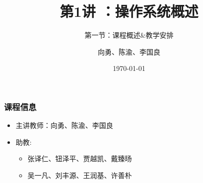 


\title[第1讲]{第1讲 ：操作系统概述} %
\subtitle{第一节：课程概述\&教学安排}
\author{向勇、陈渝、李国良} %
\date{\today} %



\begin{frame}
\titlepage %
\end{frame}

%
%
\begin{frame}
    \frametitle{课程信息}
    \begin{itemize}
        \item 主讲教师：向勇、陈渝、李国良
        
        \item 助教: 
        \begin{itemize}
            \item 张译仁、钮泽平、贾越凯、戴臻旸
            
            \item 吴一凡、刘丰源、王润基、许善朴
        \end{itemize}
    \end{itemize}
\end{frame}

